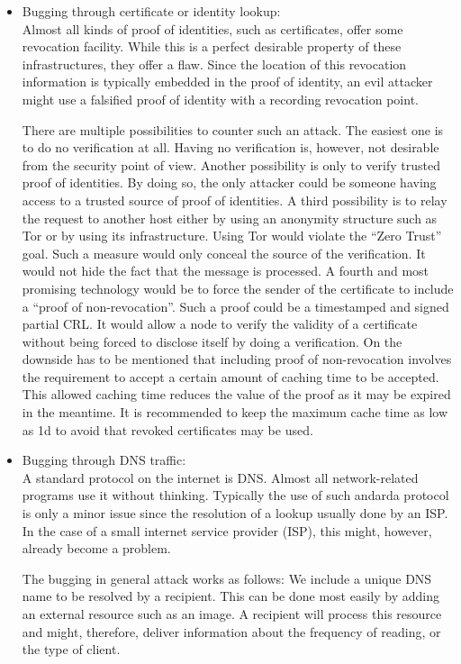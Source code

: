 \begin{itemize}
	\item Bugging through certificate or identity lookup:\\
	Almost all kinds of proof of identities, such as certificates, offer some revocation facility. While this is a perfect desirable property of these infrastructures, they offer a flaw. Since the location of this revocation information is typically embedded in the proof of identity, an evil attacker might use a falsified proof of identity with a recording revocation point.
	
	There are multiple possibilities to counter such an attack. The easiest one is to do no verification at all. Having no verification is, however, not desirable from the security point of view. Another possibility is only to verify trusted proof of identities. By doing so, the only attacker could be someone having access to a trusted source of proof of identities. A third possibility is to relay the request to another host either by using an anonymity structure such as Tor or by using its infrastructure. Using Tor would violate the ``Zero Trust'' goal. Such a measure would only conceal the source of the verification. It would not hide the fact that the message is processed. A fourth and most promising technology would be to force the sender of the certificate to include a ``proof of non-revocation''. Such a proof could be a timestamped and signed partial CRL. It would allow a node to verify the validity of a certificate without being forced to disclose itself by doing a verification. On the downside has to be mentioned that including proof of non-revocation involves the requirement to accept a certain amount of caching time to be accepted. This allowed caching time reduces the value of the proof as it may be expired in the meantime. It is recommended to keep the maximum cache time as low as 1d to avoid that revoked certificates may be used. 
	
	\item Bugging through DNS traffic:\\
	A standard protocol on the internet is DNS. Almost all network-related programs use it without thinking. Typically the use of such andarda protocol is only a minor issue since the resolution of a lookup usually done by an ISP. In the case of a small internet service provider (ISP), this might, however, already become a problem.
	
	The bugging in general attack works as follows: We include a unique DNS name to be resolved by a recipient. This can be done most easily by adding an external resource such as an image. A recipient will process this resource and might, therefore, deliver information about the frequency of reading, or the type of client. 
	

\end{itemize}
